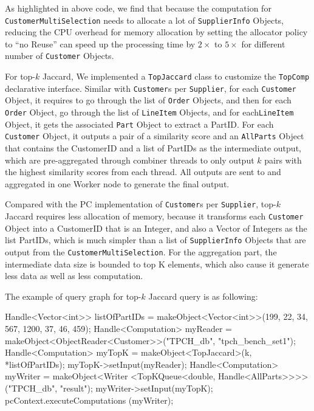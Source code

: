 As highlighted in above code,  we find
that because the computation for \texttt{CustomerMultiSelection} needs
to allocate a lot of \texttt{SupplierInfo} Objects, reducing the CPU
overhead for memory allocation by setting the allocator policy to
``no Reuse'' can speed up the processing time by $2\times$ to $5\times$ for
different number of \texttt{Customer} Objects.

\vspace{5pt}
For top-$k$ Jaccard, We implemented  a \texttt{TopJaccard} class to customize the \texttt{TopComp}
declarative interface.
Similar with \texttt{Customer}s per \texttt{Supplier}, for each
\texttt{Customer} Object, it requires to
go through the list of \texttt{Order} Objects, and then for each \texttt{Order} Object, go
through the list of \texttt{LineItem} Objects, and for
each\texttt{LineItem} Object, it gets the associated \texttt{Part}
Object to extract a PartID. For each
\texttt{Customer} Object, it outputs a pair of a similarity score and
an \texttt{AllParts} Object that contains the CustomerID and a list of PartIDs as the
intermediate output, which are pre-aggregated through combiner
threads to only output $k$ pairs with the highest similarity scores
from each thread. All outputs are sent to and aggregated in one Worker
node to generate the final output.

Compared with the PC implementation of \texttt{Customer}s per \texttt{Supplier}, 
top-$k$ Jaccard requires less allocation of memory, because it transforms each
\texttt{Customer} Object into a CustomerID that is an Integer, and
also a Vector of Integers as the list PartIDs, which is much simpler
than a list of  \texttt{SupplierInfo} Objects that are output from the
\texttt{CustomerMultiSelection}. For the aggregation part, the
intermediate data size is bounded to top K
elements, which also cause it generate less data as well as less computation. 

\vspace{5pt}
The example of query graph for top-$k$ Jaccard query is as following:

\begin{code}
    Handle<Vector<int>> listOfPartIDs = 
          makeObject<Vector<int>>(199, 22, 34, 567, 1200, 37, 46, 459);
    Handle<Computation> myReader = 
         makeObject<ObjectReader<Customer>>("TPCH_db", "tpch_bench_set1");
    Handle<Computation> myTopK = makeObject<TopJaccard>(k, *listOfPartIDs);
    myTopK->setInput(myReader);
    Handle<Computation> myWriter = makeObject<Writer
          <TopKQueue<double, Handle<AllParts>>>>("TPCH_db", "result");
    myWriter->setInput(myTopK);
    pcContext.executeComputations (myWriter);
\end{code}

